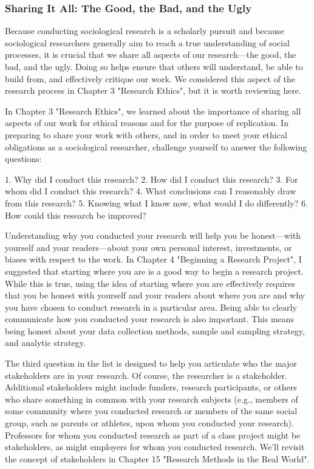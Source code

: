 \subsubsection{Sharing It All: The Good, the Bad, and the Ugly}

Because conducting sociological research is a scholarly pursuit and because sociological researchers generally aim to reach a true understanding of social processes, it is crucial that we share all aspects of our research—the good, the bad, and the ugly. Doing so helps ensure that others will understand, be able to build from, and effectively critique our work. We considered this aspect of the research process in Chapter 3 "Research Ethics", but it is worth reviewing here.

In Chapter 3 "Research Ethics", we learned about the importance of sharing all aspects of our work for ethical reasons and for the purpose of replication. In preparing to share your work with others, and in order to meet your ethical obligations as a sociological researcher, challenge yourself to answer the following questions:

1. Why did I conduct this research?
2. How did I conduct this research?
3. For whom did I conduct this research?
4. What conclusions can I reasonably draw from this research?
5. Knowing what I know now, what would I do differently?
6. How could this research be improved?

Understanding why you conducted your research will help you be honest—with yourself and your readers—about your own personal interest, investments, or biases with respect to the work. In Chapter 4 "Beginning a Research Project", I suggested that starting where you are is a good way to begin a research project. While this is true, using the idea of starting where you are effectively requires that you be honest with yourself and your readers about where you are and why you have chosen to conduct research in a particular area. Being able to clearly communicate how you conducted your research is also important. This means being honest about your data collection methods, sample and sampling strategy, and analytic strategy.

The third question in the list is designed to help you articulate who the major stakeholders are in your research. Of course, the researcher is a stakeholder. Additional stakeholders might include funders, research participants, or others who share something in common with your research subjects (e.g., members of some community where you conducted research or members of the same social group, such as parents or athletes, upon whom you conducted your research). Professors for whom you conducted research as part of a class project might be stakeholders, as might employers for whom you conducted research. We’ll revisit the concept of stakeholders in Chapter 15 "Research Methods in the Real World".

